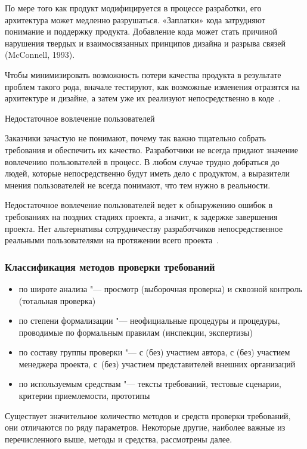 \documentclass{../industrial-development}
\begin{document}
{По мере того как продукт модифицируется в процессе разработки, его архитектура может медленно разрушаться. «Заплатки» кода затрудняют понимание и поддержку продукта. Добавление кода может стать причиной нарушения твердых и взаимосвязанных принципов дизайна и разрыва связей (McConnell, 1993). 

Чтобы минимизировать возможность потери качества продукта в результате проблем такого рода, вначале тестируют, как возможные изменения отразятся на архитектуре и дизайне, а затем уже их реализуют непосредственно в коде~\cite[с.~17--18]{Wiegers}.

\alert{Недостаточное вовлечение пользователей}

Заказчики зачастую не понимают, почему так важно тщательно собрать требования и обеспечить их качество. Разработчики не всегда придают значение вовлечению пользователей в процесс. В любом случае трудно добраться до людей, которые непосредственно будут иметь дело с продуктом, а выразители мнения пользователей не всегда понимают, что тем нужно в реальности. 

Недостаточное вовлечение пользователей ведет к обнаружению ошибок в требованиях на поздних стадиях проекта, а значит, к задержке завершения проекта. Нет альтернативы сотрудничеству разработчиков непосредственное реальными пользователями на протяжении всего проекта~\cite[с.~17]{Wiegers}.


\begin{frame} \frametitle {Классификация методов проверки требований}

\begin{itemize}
\item по широте анализа "--- просмотр (выборочная проверка) и сквозной контроль (тотальная проверка)
\item по степени формализации "--- неофициальные процедуры и процедуры, проводимые по формальным правилам (инспекции, экспертизы)
\item по составу группы проверки "--- с (без) участием автора, с (без) участием менеджера проекта, с~(без) участием представителей внешних организаций
\item по используемым средствам "--- тексты требований, тестовые сценарии, критерии приемлемости, прототипы

\end{itemize}
\end{frame}

\lecturenotes

Существует значительное количество методов и средств проверки требований, они отличаются по ряду параметров. Некоторые другие, наиболее важные из перечисленного выше, методы и средства, рассмотрены далее.


}
\end{document}

